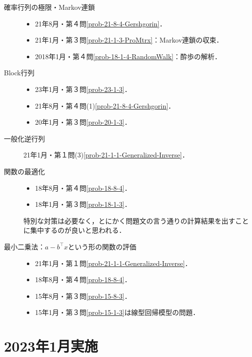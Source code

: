 \documentclass[uplatex,dvipdfmx]{jsarticle}
\begin{document}
\begin{description}
\begin{description}
        \item[確率行列の極限・Markov連鎖] \mbox{}
        \begin{itemize}
            \item 21年8月・第４問\ref{prob-21-8-4-Gershgorin}．
            \item 21年1月・第３問\ref{prob-21-1-3-ProMtrx}：Markov連鎖の収束．
            \item 2018年1月・第４問\ref{prob-18-1-4-RandomWalk}：酔歩の解析．
        \end{itemize}
        \item[Block行列] \mbox{}
        \begin{itemize}
            \item 23年1月・第３問\ref{prob-23-1-3}．
            \item 21年8月・第４問(1)\ref{prob-21-8-4-Gershgorin}．
            \item 20年1月・第３問\ref{prob-20-1-3}．
        \end{itemize}
        \item[一般化逆行列] 21年1月・第１問(3)\ref{prob-21-1-1-Generalized-Inverse}．
        
        \item[関数の最適化] \mbox{}
        \begin{itemize}
            \item 18年8月・第４問\ref{prob-18-8-4}．
            \item 18年1月・第３問\ref{prob-18-1-3}．
        \end{itemize}
        特別な対策は必要なく，とにかく問題文の言う通りの計算結果を出すことに集中するのが良いと思われる．
        \item[最小二乗法：$a-b^\top x$という形の関数の評価] \mbox{}
        \begin{itemize}
            \item 21年1月・第１問\ref{prob-21-1-1-Generalized-Inverse}．
            \item 18年8月・第４問\ref{prob-18-8-4}．
            \item 15年8月・第３問\ref{prob-15-8-3}．
            \item 15年1月・第３問\ref{prob-15-1-3}は線型回帰模型の問題．
        \end{itemize}
    \end{description}
\end{description}

\section{2023年1月実施}
\end{document}
